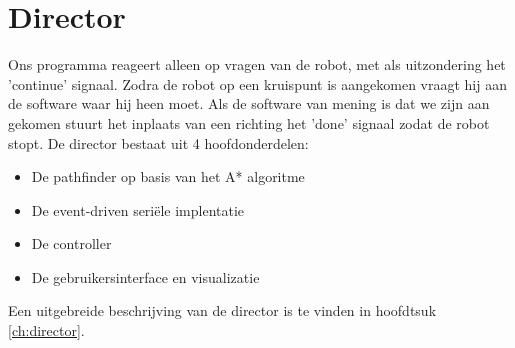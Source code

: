 \documentclass{report}
\begin{document}
\section{Director}
Ons programma reageert alleen op vragen van de robot, met als uitzondering het 'continue' signaal. Zodra de robot op een kruispunt is aangekomen vraagt hij aan de software waar hij heen moet. Als de software van mening is dat we zijn aan gekomen stuurt het inplaats van een richting het 'done' signaal zodat de robot stopt. De director bestaat uit 4 hoofdonderdelen:
\begin{itemize}
\item De pathfinder op basis van het A* algoritme
\item De event-driven seriële implentatie
\item De controller
\item De gebruikersinterface en visualizatie
\end{itemize}
Een uitgebreide beschrijving van de director is te vinden in hoofdtsuk \ref{ch:director}.
\end{document}
